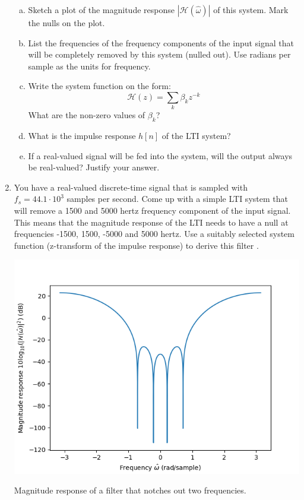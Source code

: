 \begin{enumerate}
\begin{enumerate}[a)]
  \item Sketch a plot of the magnitude response $|\mathcal{H}(\hat{\omega})|$ of this system. Mark the nulls on the plot.
  \item List the frequencies of the frequency components of the input signal that will be completely removed by this system (nulled out). Use radians per sample as the units for frequency.
  \item Write the system function on the form:
    \begin{equation}
      \mathcal{H}(z) = \sum_k \beta_k z^{-k}
    \end{equation}
    What are the non-zero values of $\beta_k$?
  \item What is the impulse response $h[n]$ of the LTI system?
  \item If a real-valued signal will be fed into the system, will the output always be real-valued? Justify your answer.
  \end{enumerate}
  
\item You have a real-valued discrete-time signal that is sampled with $f_s=44.1 \cdot 10^{3}$ samples per second. 
Come up with a simple LTI system that will remove a 1500 and 5000 hertz frequency component of the input signal. 
This means that the magnitude response of the LTI needs to have a null at frequencies -1500, 1500, -5000 and 5000 hertz. 
Use a suitably selected system function (z-transform of the impulse response) to derive this filter
.

\begin{marginfigure}
\begin{center}
\includegraphics[width=\textwidth]{ch18/figures/ex_magresp.png}
\end{center}
\caption{Magnitude response of a filter that notches out two frequencies.}
\label{fig:2notch}
\end{marginfigure}


\end{enumerate}
